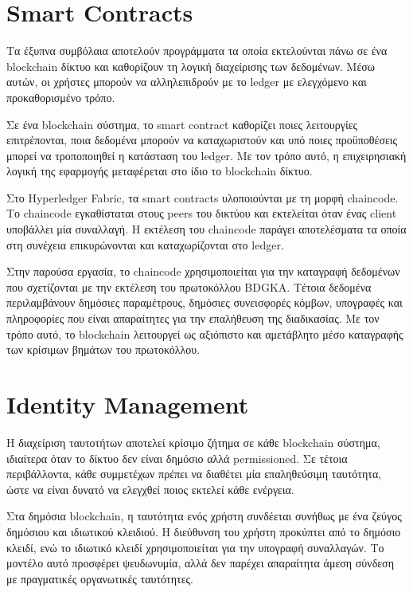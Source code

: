 \documentclass[12pt,a4paper]{report}
\begin{document}
\section{Smart Contracts}

Τα έξυπνα συμβόλαια αποτελούν προγράμματα τα οποία εκτελούνται πάνω σε ένα blockchain δίκτυο και καθορίζουν τη λογική διαχείρισης των δεδομένων. Μέσω αυτών, οι χρήστες μπορούν να αλληλεπιδρούν με το ledger με ελεγχόμενο και προκαθορισμένο τρόπο.

Σε ένα blockchain σύστημα, το smart contract καθορίζει ποιες λειτουργίες επιτρέπονται, ποια δεδομένα μπορούν να καταχωριστούν και υπό ποιες προϋποθέσεις μπορεί να τροποποιηθεί η κατάσταση του ledger. Με τον τρόπο αυτό, η επιχειρησιακή λογική της εφαρμογής μεταφέρεται στο ίδιο το blockchain δίκτυο.

Στο Hyperledger Fabric, τα smart contracts υλοποιούνται με τη μορφή chaincode. Το chaincode εγκαθίσταται στους peers του δικτύου και εκτελείται όταν ένας client υποβάλλει μία συναλλαγή. Η εκτέλεση του chaincode παράγει αποτελέσματα τα οποία στη συνέχεια επικυρώνονται και καταχωρίζονται στο ledger.

Στην παρούσα εργασία, το chaincode χρησιμοποιείται για την καταγραφή δεδομένων που σχετίζονται με την εκτέλεση του πρωτοκόλλου BDGKA. Τέτοια δεδομένα περιλαμβάνουν δημόσιες παραμέτρους, δημόσιες συνεισφορές κόμβων, υπογραφές και πληροφορίες που είναι απαραίτητες για την επαλήθευση της διαδικασίας. Με τον τρόπο αυτό, το blockchain λειτουργεί ως αξιόπιστο και αμετάβλητο μέσο καταγραφής των κρίσιμων βημάτων του πρωτοκόλλου.

\section{Identity Management}

Η διαχείριση ταυτοτήτων αποτελεί κρίσιμο ζήτημα σε κάθε blockchain σύστημα, ιδιαίτερα όταν το δίκτυο δεν είναι δημόσιο αλλά permissioned. Σε τέτοια περιβάλλοντα, κάθε συμμετέχων πρέπει να διαθέτει μία επαληθεύσιμη ταυτότητα, ώστε να είναι δυνατό να ελεγχθεί ποιος εκτελεί κάθε ενέργεια.

Στα δημόσια blockchain, η ταυτότητα ενός χρήστη συνδέεται συνήθως με ένα ζεύγος δημόσιου και ιδιωτικού κλειδιού. Η διεύθυνση του χρήστη προκύπτει από το δημόσιο κλειδί, ενώ το ιδιωτικό κλειδί χρησιμοποιείται για την υπογραφή συναλλαγών. Το μοντέλο αυτό προσφέρει ψευδωνυμία, αλλά δεν παρέχει απαραίτητα άμεση σύνδεση με πραγματικές οργανωτικές ταυτότητες.
\end{document}
